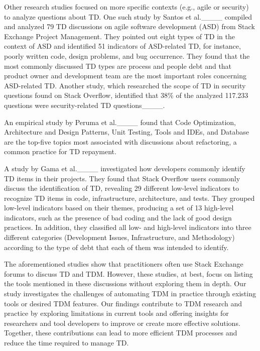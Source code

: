 Other research studies focused on more specific contexts (e.g., agile or security) to analyze  questions about TD. One such study by Santos et al.____ compiled and analyzed 79 TD discussions on agile software development (ASD) from Stack Exchange Project Management. They pointed out eight types of TD in the context of ASD and identified 51 indicators of ASD-related TD, for instance, poorly written code, design problems, and bug occurrence. They found that the most commonly discussed TD types are process and people debt and that product owner and development team are the most important roles concerning ASD-related TD. Another study, which researched the scope of TD in security questions found on Stack Overflow, identified that 38\% of the analyzed 117.233 questions were security-related TD questions____.

An empirical study by Peruma et al.____ found that Code Optimization, Architecture and Design Patterns, Unit Testing, Tools and IDEs, and Database are the top-five topics most associated with discussions about refactoring, a common practice for TD repayment.

A study by Gama et al.____ investigated how developers commonly identify TD items in their projects. They found that Stack Overflow users commonly discuss the identification of TD, revealing 29 different low-level indicators to recognize TD items in code, infrastructure, architecture, and tests. They grouped low-level indicators based on their themes, producing a set of 13 high-level indicators, such as the presence of bad coding and the lack of good design practices. In addition, they classified all low- and high-level indicators into three different categories (Development Issues, Infrastructure, and Methodology) according to the type of debt that each of them was intended to identify.

The aforementioned studies show that practitioners often use Stack Exchange forums to discuss TD and TDM. However, these studies, at best, focus on listing the tools mentioned in these discussions without exploring them in depth.
Our study investigates the challenges of automating TDM in practice through existing tools or desired TDM features. Our findings contribute to TDM research and practice by exploring limitations in current tools and offering insights for researchers and tool developers to improve or create more effective solutions. Together, these contributions can lead to more efficient TDM processes and reduce the time required to manage TD.